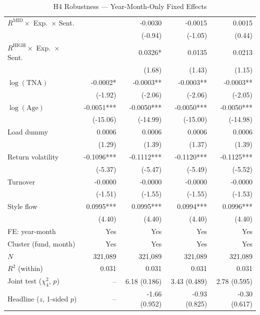 \begin{table}[!htbp]
{\begin{tabular*}{\linewidth}{@{\extracolsep{\fill}}lrrrr}
$R^{\text{MID}}\times$ Exp.\ $\times$ Sent. &  & -0.0030 & -0.0015 & 0.0015\\
 &  & (-0.94) & (-1.05) & (0.44)\\
$R^{\text{HIGH}}\times$ Exp.\ $\times$ Sent. &  & 0.0326* & 0.0135 & 0.0213\\
 &  & (1.68) & (1.43) & (1.15)\\
$\log(\text{TNA})$ & -0.0002* & -0.0003** & -0.0003** & -0.0003**\\
 & (-1.92) & (-2.06) & (-2.06) & (-2.05)\\
$\log(\text{Age})$ & -0.0051*** & -0.0050*** & -0.0050*** & -0.0050***\\
 & (-15.06) & (-14.99) & (-15.00) & (-14.98)\\
Load dummy & 0.0006 & 0.0006 & 0.0006 & 0.0006\\
 & (1.29) & (1.39) & (1.37) & (1.39)\\
Return volatility & -0.1096*** & -0.1112*** & -0.1120*** & -0.1125***\\
 & (-5.37) & (-5.47) & (-5.49) & (-5.52)\\
Turnover & -0.0000 & -0.0000 & -0.0000 & -0.0000\\
 & (-1.51) & (-1.55) & (-1.55) & (-1.53)\\
Style flow & 0.0995*** & 0.0995*** & 0.0994*** & 0.0996***\\
 & (4.40) & (4.40) & (4.40) & (4.40)\\
\midrule
FE: year-month & Yes & Yes & Yes & Yes\\
Cluster (fund, month) & Yes & Yes & Yes & Yes\\
$N$ & 321,089 & 321,089 & 321,089 & 321,089\\
$R^2$ (within) & 0.031 & 0.031 & 0.031 & 0.031\\
Joint test ($\chi^2_4$, $p$) & -- & 6.18 (0.186) & 3.43 (0.489) & 2.78 (0.595)\\
Headline ($z$, 1-sided $p$) & -- & -1.66 (0.952) & -0.93 (0.825) & -0.30 (0.617)\\
\bottomrule
\end{tabular*}%
}\sbefit
\fi
\setlength{\tabletempwidth}{\wd\tabletempbox}
\ifdim\tabletempwidth>\linewidth\setlength{\tabletempwidth}{\linewidth}\fi
\begin{minipage}{\tabletempwidth}
\captionsetup{width=\linewidth}
\caption{H4 Robustness --- Year-Month-Only Fixed Effects}\label{tab:H4_robustness}
\ifdim\wd\tabletempbox>\linewidth
  \resizebox{\linewidth}{!}{\usebox{\tabletempbox}}
\else
  \usebox{\tabletempbox}
\fi

\end{minipage}
\end{table}
